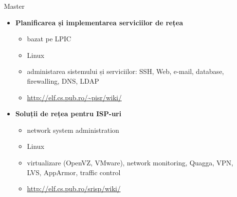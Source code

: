 \documentclass{simple}
\begin{document}

\begin{frame}{Master}
	\begin{itemize}
		\item \textbf{Planificarea și implementarea serviciilor de rețea}
			\begin{itemize}
				\item bazat pe LPIC
				\item Linux
				\item administarea sistemului și serviciilor: SSH, Web,
				e-mail, database, firewalling, DNS, LDAP
				\item \url{http://elf.cs.pub.ro/~pisr/wiki/}
			\end{itemize}
		\item \textbf{Soluții de rețea pentru ISP-uri}
			\begin{itemize}
				\item network system administration
				\item Linux
				\item virtualizare (OpenVZ, VMware), network monitoring,
				Quagga, VPN, LVS, AppArmor, traffic control
				\item \url{http://elf.cs.pub.ro/srisp/wiki/}
			\end{itemize}
	\end{itemize}
\end{frame}
\end{document}
